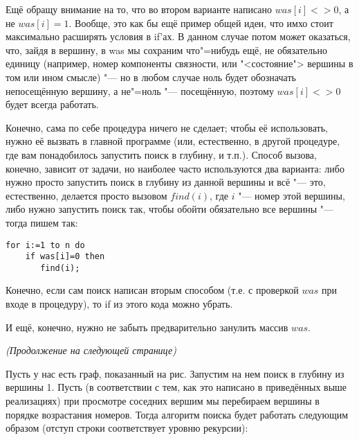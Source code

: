 Ещё обращу внимание на то, что во втором варианте написано $was[i]<>0$, а не $was[i]=1$. Вообще, 
это как бы ещё пример общей идеи, что имхо стоит максимально расширять условия в if'ах. В данном 
случае потом может оказаться, что, зайдя в вершину, в was мы сохраним что"=нибудь ещё, не 
обязательно единицу (например, номер компоненты связности, или "<состояние"> вершины в том или ином 
смысле) "--- но в любом случае ноль будет обозначать непосещённую вершину, а не"=ноль "--- 
посещённую, поэтому $was[i]<>0$ будет всегда работать.

\label{howtocall}
Конечно, сама по себе процедура ничего не сделает; чтобы её 
использовать, нужно её вызвать в главной программе (или, естественно, в другой процедуре, где вам 
понадобилось запустить поиск в глубину, и т.п.). Способ вызова, конечно, зависит от задачи, но 
наиболее часто используются два варианта: либо нужно просто запустить поиск в глубину из данной 
вершины и всё "--- это, естественно, делается просто вызовом $find(i)$, где $i$ "--- номер этой 
вершины, либо нужно запустить поиск так, чтобы обойти обязательно все вершины "--- тогда пишем так:
\begin{codesampleo}\begin{verbatim}
for i:=1 to n do
    if was[i]=0 then
       find(i);
\end{verbatim}
\end{codesampleo}
Конечно, если сам поиск написан вторым способом (т.е. с проверкой $was$ при входе в процедуру), то 
if из этого кода можно убрать.

И ещё, конечно, нужно не забыть предварительно занулить массив $was$.


\vspace{3cm}

\textit{(Продолжение на следующей странице)}

\eject
{}
Пусть у нас есть граф, показанный на рис. Запустим на нем поиск в глубину из вершины 1. Пусть (в 
соответствии с тем, как это написано в приведённых выше реализациях) при  
просмотре соседних вершим мы перебираем вершины в порядке возрастания номеров. Тогда алгоритм 
поиска будет работать следующим образом (отступ строки соответствует уровню рекурсии):

